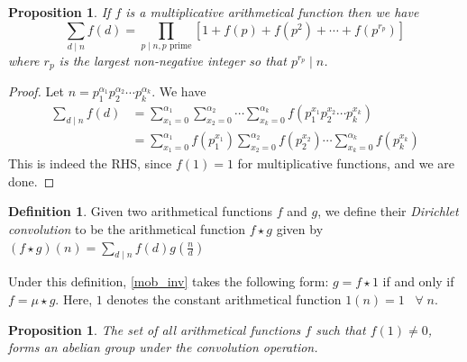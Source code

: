 \documentclass[10pt,openany]{book}
\newtheorem{proposition}[theorem]{Proposition}
\theoremstyle{italicnonumber}
\theoremstyle{definition}
\newtheorem{definition}[theorem]{Definition}
\let\oldforall\forall
\renewcommand{\forall}{\;\oldforall\;}
\begin{document}
\begin{proposition}
  If $f$ is a multiplicative arithmetical function then we have
  \[
  \sum_{d \mid n} f(d) = \prod_{p \mid n, p \text{ prime}} \left[ 1 + f(p) + f(p^2) + \cdots + f(p^{r_p}) \right]
  \]
  where $r_p$ is the largest non-negative integer so that $p^{r_p} \mid n$.
\end{proposition}

\begin{proof}
  Let $n=p_1^{\alpha_1} p_2^{\alpha_2} \cdots p_k^{\alpha_k}$. We have
  \[
  \begin{aligned}
  \sum_{d \mid n} f(d)
  &= \sum_{x_1=0}^{\alpha_1} \sum_{x_2=0}^{\alpha_2} \cdots \sum_{x_k=0}^{\alpha_k}
  f(p_1^{x_1} p_2^{x_2} \cdots p_k^{x_k}) \\
  & = \sum_{x_1=0}^{\alpha_1} f(p_1^{x_1}) \sum_{x_2=0}^{\alpha_2} f(p_2^{x_2}) \cdots \sum_{x_k=0}^{\alpha_k} f(p_k^{x_k})
  \end{aligned}
  \]
  This is indeed the RHS, since $f(1)=1$ for multiplicative functions, and we are done.
\end{proof}

\begin{definition}
  Given two arithmetical functions $f$ and $g$, we define their \textit{Dirichlet convolution} to be the arithmetical function $f \star g$ given by $(f \star g)(n) = \sum_{d\mid n} f(d) g\left(\frac{n}{d}\right)$
\end{definition}

Under this definition, \cref{mob_inv} takes the following form: $g = f \star 1$ if and only if $f = \mu \star g$. Here, $1$ denotes the constant arithmetical function $1(n) = 1 \; \; \forall n$.

\begin{proposition}
  The set of all arithmetical functions $f$ such that $f(1) \neq 0$, forms an abelian group under the convolution operation.
\end{proposition}
\end{document}
